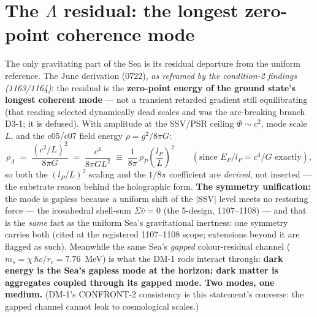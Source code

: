 \documentclass[11pt]{article}
\newcommand{\rL}{\rho_\Lambda}
\begin{document}
\section{The $\Lambda$ residual: the longest zero-point coherence mode}
\label{sec:lambda}
The only gravitating part of the Sea is its residual departure from the uniform reference. The June
derivation (0722), \emph{as reframed by the condition-2 findings (1163/1164)}: the residual is the
\textbf{zero-point energy of the ground state's longest coherent mode} --- not a transient retarded
gradient still equilibrating (that reading selected dynamically dead scales and was the arc-breaking
branch D3-1; it is defused). With amplitude at the SSV/PSR ceiling $\Phi \sim c^2$, mode scale $L$,
and the c05/c07 field energy $\rho = g^2/8\pi G$:
\[ \rL \;=\; \frac{(c^2/L)^2}{8\pi G} \;=\; \frac{c^4}{8\pi G L^2}
   \;\equiv\; \frac{1}{8\pi}\,\rho_P\left(\frac{l_P}{L}\right)^2
   \qquad (\text{since } E_P/l_P = c^4/G \text{ exactly}), \]
so both the $(l_P/L)^2$ scaling and the $1/8\pi$ coefficient are \emph{derived}, not inserted ---
the substrate reason behind the holographic form. \textbf{The symmetry unification:} the mode is
gapless because a uniform shift of the $|$SSV$|$ level meets no restoring force --- the icosahedral
shell-sum $\Sigma \hat v = 0$ (the 5-design, 1107--1108) --- and that is the \emph{same} fact as the
uniform Sea's gravitational inertness: one symmetry carries both (cited at the registered 1107--1108 scope; extensions beyond it are flagged as such). Meanwhile the same Sea's
\emph{gapped} colour-residual channel ($m_s = \chi\,\hbar c/r_c = 7.76$~MeV) is what the DM-1 rods
interact through: \textbf{dark energy is the Sea's gapless mode at the horizon; dark matter is
aggregates coupled through its gapped mode. Two modes, one medium.} (DM-1's CONFRONT-2 consistency is
this statement's converse: the gapped channel cannot leak to cosmological scales.)
\end{document}
